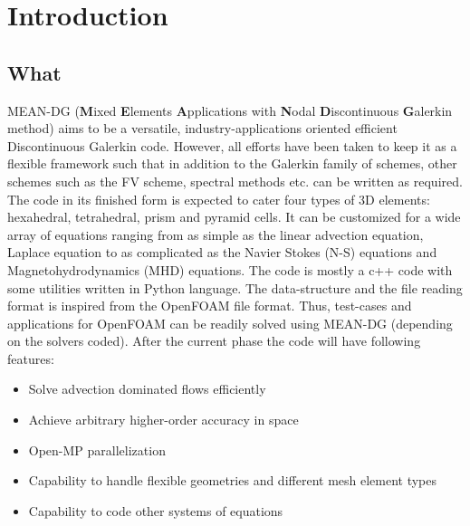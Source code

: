 \chapter{Introduction}
\section{What}

MEAN-DG ({\bf M}ixed {\bf E}lements {\bf A}pplications with {\bf N}odal {\bf D}iscontinuous {\bf G}alerkin method) 
aims to be a versatile, industry-applications oriented efficient Discontinuous Galerkin code. 
However, all efforts have been taken to  keep it as a flexible framework such that in addition to the Galerkin family
of schemes, other schemes such as the FV scheme, spectral methods etc. can be written as required. 
The code in its finished form is expected to cater four types of 3D elements: hexahedral, tetrahedral, prism and pyramid cells.
It can be customized for a wide array of equations ranging from as simple as the linear advection equation, Laplace equation
to as complicated as the Navier Stokes (N-S) equations and Magnetohydrodynamics (MHD) equations. 
The code is mostly a c++ code with some utilities written in Python language. 
The data-structure and the file reading format is inspired from the OpenFOAM file format. Thus, test-cases
and applications for OpenFOAM can be readily solved using MEAN-DG (depending on the solvers coded).
After the current phase the code will have following features:
\begin{itemize}
	\item  Solve advection dominated flows efficiently
	\item  Achieve arbitrary higher-order accuracy in space
	\item  Open-MP parallelization 
	\item  Capability to handle flexible geometries and different mesh element types
	\item  Capability to code other systems of equations
\end{itemize}

